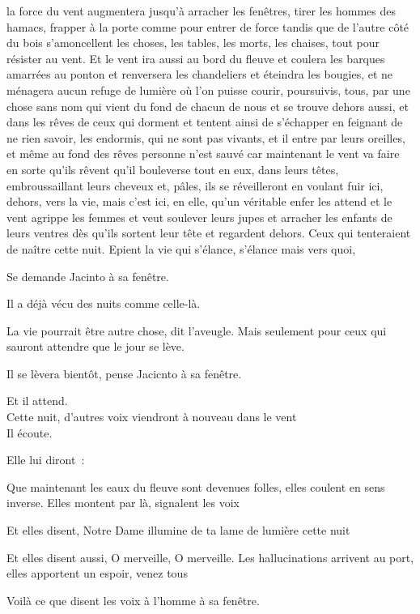 la force du vent augmentera jusqu'à arracher les fenêtres, tirer les
hommes des hamacs, frapper à la porte comme pour entrer de force tandis
que de l'autre côté du bois s'amoncellent les choses, les tables, les
morts, les chaises, tout pour résister au vent. Et le vent ira aussi au
bord du fleuve et coulera les barques amarrées au ponton et renversera
les chandeliers et éteindra les bougies, et ne ménagera aucun refuge de
lumière où l'on puisse courir, poursuivis, tous, par une chose sans nom
qui vient du fond de chacun de nous et se trouve dehors aussi, et dans
les rêves de ceux qui dorment et tentent ainsi de s'échapper en feignant
de ne rien savoir, les endormis, qui ne sont pas vivants, et il entre
par leurs oreilles, et même au fond des rêves personne n'est sauvé car
maintenant le vent va faire en sorte qu'ils rêvent qu'il bouleverse tout
en eux, dans leurs têtes, embroussaillant leurs cheveux et, pâles, ils
se réveilleront en voulant fuir ici, dehors, vers la vie, mais c'est
ici, en elle, qu'un véritable enfer les attend et le vent agrippe les
femmes et veut soulever leurs jupes et arracher les enfants de leurs
ventres dès qu'ils sortent leur tête et regardent dehors. Ceux qui
tenteraient de naître cette nuit. Epient la vie qui s'élance, s'élance
mais vers quoi,

Se demande Jacinto à sa fenêtre.

Il a déjà vécu des nuits comme celle-là.

La vie pourrait être autre chose, dit l'aveugle. Mais seulement pour
ceux qui sauront attendre que le jour se lève.

Il se lèvera bientôt, pense Jacicnto à sa fenêtre.

Et il attend.\\

Cette nuit, d'autres voix viendront à nouveau dans le vent\\

Il écoute.

Elle lui diront~:

Que maintenant les eaux du fleuve sont devenues folles, elles coulent en
sens inverse. Elles montent par là, signalent les voix

Et elles disent, Notre Dame illumine de ta lame de lumière cette nuit

Et elles disent aussi, O merveille, O merveille. Les hallucinations
arrivent au port, elles apportent un espoir, venez tous

Voilà ce que disent les voix à l'homme à sa fenêtre.

